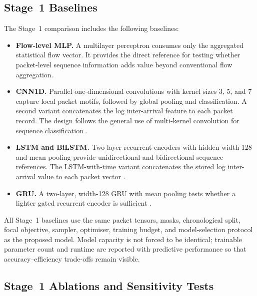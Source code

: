 \documentclass[11pt,fleqn]{report}
\begin{document}
\subsection{Stage~1 Baselines}
\label{subsubsec:stage1_baselines}

The Stage~1 comparison includes the following baselines:

\begin{itemize}[leftmargin=*]
    \item \textbf{Flow-level MLP.} A multilayer perceptron consumes only the aggregated statistical flow vector. It provides the direct reference for testing whether packet-level sequence information adds value beyond conventional flow aggregation.

    \item \textbf{CNN1D.} Parallel one-dimensional convolutions with kernel sizes 3, 5, and 7 capture local packet motifs, followed by global pooling and classification. A second variant concatenates the log inter-arrival feature to each packet record. The design follows the general use of multi-kernel convolution for sequence classification \cite{Kim2014CNN}.

    \item \textbf{LSTM and BiLSTM.} Two-layer recurrent encoders with hidden width 128 and mean pooling provide unidirectional and bidirectional sequence references. The LSTM-with-time variant concatenates the stored log inter-arrival value to each packet vector
    \cite{Hochreiter1997LSTM}.

    \item \textbf{GRU.} A two-layer, width-128 GRU with mean pooling tests whether a lighter gated recurrent encoder is sufficient \cite{Cho2014GRU}.

\end{itemize}

All Stage~1 baselines use the same packet tensors, masks, chronological split, focal objective, sampler, optimiser, training budget, and model-selection protocol as the proposed model. Model capacity is not forced to be identical; trainable parameter count and runtime are reported with predictive performance so that accuracy--efficiency trade-offs remain visible.

\subsection{Stage~1 Ablations and Sensitivity Tests}
\label{subsubsec:stage1_ablation_protocol}
\end{document}
